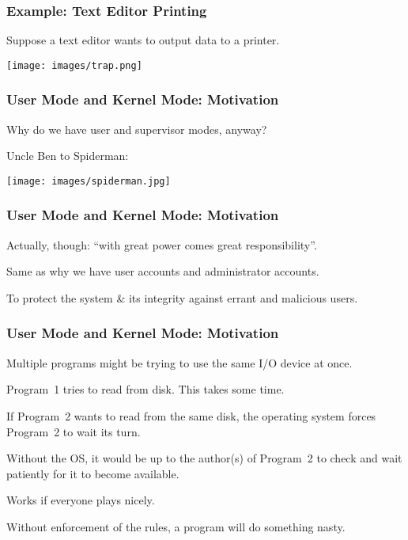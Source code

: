 \begin{frame}
	\frametitle{Example: Text Editor Printing}

	Suppose a text editor wants to output data to a printer.

	\begin{center}
		\texttt{[image: images/trap.png]}
	\end{center}

\end{frame}

\begin{frame}
	\frametitle{User Mode and Kernel Mode: Motivation}

	Why do we have user and supervisor modes, anyway?

	Uncle Ben to Spiderman:
	\begin{center}
		\texttt{[image: images/spiderman.jpg]}
	\end{center}

\end{frame}

\begin{frame}
	\frametitle{User Mode and Kernel Mode: Motivation}


	Actually, though: ``with great power comes great responsibility''.


	Same as why we have user accounts and administrator accounts.

	To protect the system \& its integrity against errant and malicious users.


\end{frame}

\begin{frame}
	\frametitle{User Mode and Kernel Mode: Motivation}

	Multiple programs might be trying to use the same I/O device at once.

	Program~1 tries to read from disk. This takes some time.

	If Program~2 wants to read from the same disk, the operating system forces Program~2 to wait its turn.

	Without the OS, it would be up to the author(s) of Program~2 to check and wait patiently for it to become available.

	Works if everyone plays nicely.

	Without enforcement of the rules, a program will do something nasty.

\end{frame}

